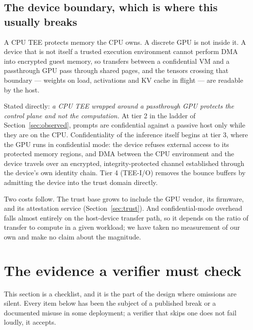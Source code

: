\documentclass[11pt]{article}
\begin{document}
\subsection{The device boundary, which is where this usually breaks}

A CPU TEE protects memory the CPU owns. A discrete GPU is not inside it. A device that is not itself
a trusted execution environment cannot perform DMA into encrypted guest memory, so transfers between
a confidential VM and a passthrough GPU pass through shared pages, and the tensors crossing that
boundary --- weights on load, activations and KV cache in flight --- are readable by the host.

Stated directly: \emph{a CPU TEE wrapped around a passthrough GPU protects the control plane and
not the computation.} At tier 2 in the ladder of
Section~\ref{sec:observed}, prompts are confidential against a passive host only while they are on
the CPU. Confidentiality of the inference itself begins at tier 3, where the GPU runs in
confidential mode: the device refuses external access to its protected memory regions, and DMA
between the CPU environment and the device travels over an encrypted, integrity-protected channel
established through the device's own identity chain. Tier 4 (TEE-I/O) removes the bounce buffers by
admitting the device into the trust domain directly.

Two costs follow. The trust base grows to include the GPU vendor, its firmware, and its attestation
service (Section~\ref{sec:trust}). And confidential-mode overhead falls almost entirely on the
host-device transfer path, so it depends on the ratio of transfer to compute in a given workload; we
have taken no measurement of our own and make no claim about the magnitude.

\section{The evidence a verifier must check}
\label{sec:evidence}

This section is a checklist, and it is the part of the design where omissions are silent. Every item
below has been the subject of a published break or a documented misuse in some deployment; a
verifier that skips one does not fail loudly, it accepts.
\end{document}

